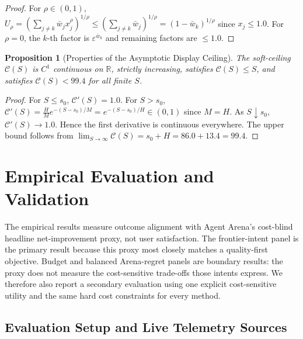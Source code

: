 \documentclass[pdflatex,sn-mathphys-num]{sn-jnl}
\theoremstyle{thmstyleone}
\newtheorem{proposition}{Proposition}
\theoremstyle{thmstylethree}
\begin{document}
\begin{proof}
For $\rho \in (0, 1)$, $U_\rho = (\sum_{j \neq k} \bar{w}_j x_j^\rho)^{1/\rho} \le (\sum_{j \neq k} \bar{w}_j)^{1/\rho} = (1 - \bar{w}_k)^{1/\rho}$ since $x_j \le 1.0$. For $\rho = 0$, the $k$-th factor is $\varepsilon^{\bar{w}_k}$ and remaining factors are $\le 1.0$.
\end{proof}

\begin{proposition}[Properties of the Asymptotic Display Ceiling]\label{prop:ceiling_props}
The soft-ceiling $\mathcal{C}(S)$ is $C^1$ continuous on $\mathbb{R}$, strictly increasing, satisfies $\mathcal{C}(S) \le S$, and satisfies $\mathcal{C}(S) < 99.4$ for all finite $S$.
\end{proposition}

\begin{proof}
For $S \le s_0$, $\mathcal{C}'(S) = 1.0$. For $S > s_0$, $\mathcal{C}'(S) = \frac{H}{M} e^{-(S - s_0)/M} = e^{-(S - s_0)/H} \in (0, 1)$ since $M = H$. As $S \downarrow s_0$, $\mathcal{C}'(S) \to 1.0$. Hence the first derivative is continuous everywhere. The upper bound follows from $\lim_{S \to \infty} \mathcal{C}(S) = s_0 + H = 86.0 + 13.4 = 99.4$.
\end{proof}

\section{Empirical Evaluation and Validation}\label{sec:evaluation}

The empirical results measure outcome alignment with Agent Arena's cost-blind headline net-improvement proxy, not user satisfaction. The frontier-intent panel is the primary result because this proxy most closely matches a quality-first objective. Budget and balanced Arena-regret panels are boundary results: the proxy does not measure the cost-sensitive trade-offs those intents express. We therefore also report a secondary evaluation using one explicit cost-sensitive utility and the same hard cost constraints for every method.

\subsection{Evaluation Setup and Live Telemetry Sources}\label{subsec:eval_setup}
\end{document}
